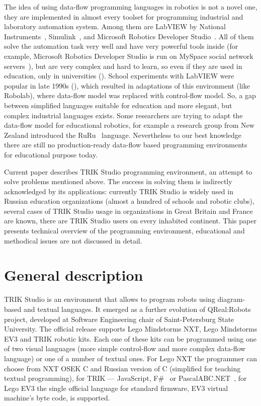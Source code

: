 \documentclass[conference]{IEEEtran}
\begin{document}
The idea of using data-flow programming languages in robotics is not a novel one, they are implemented in almost every toolset for programming industrial and laboratory automation system. Among them are LabVIEW by National Instruments~\cite{kodosky1991visual}, Simulink~\cite{dabney2004mastering}, and Microsoft Robotics Developer Studio~\cite{jackson2007microsoft}. All of them solve the automation task very well and have very powerful tools inside (for example, Microsoft Robotics Developer Studio is run on MySpace social network servers~\cite{scherotter2009ccr}), but are very complex and hard to learn, so even if they are used in education, only in universities (\cite{stefanovic2011labview,yi2005labview}). School experiments with LabVIEW were popular in late 1990s (\cite{cyr1997low,portsmore1999robolab}), which resulted in adaptations of this environment (like Robolab), where data-flow model was replaced with control-flow model. So, a gap between simplified languages suitable for education and more elegant, but complex industrial languages exists. Some researchers are trying to adapt the data-flow model for educational robotics, for example a research group from New Zealand introduced the RuRu~\cite{diprose2011ruru} language. Nevertheless to our best knowledge there are still no production-ready data-flow based programming environments for educational purpose today.

Current paper describes TRIK Studio programming environment, an attempt to solve problems mentioned above. The success in solving them is indirectly acknowledged by its applications: currently TRIK Studio is widely used in Russian education organizations (almost a hundred of schools and robotic clubs), several cases of TRIK Studio usage in organizations in Great Britain and France are known, there are TRIK Studio users on every inhabited continent. This paper presents technical overview of the programming environment, educational and methodical issues are not discussed in detail.

\section{General description}
\label{chapter:generalDescription}

TRIK Studio is an environment that allows to program robots using diagram-based and textual languages. It 	emerged as a further evolution of QReal:Robots~\cite{terekhov2013sreda} project, developed at Software Engineering chair of Saint-Petersburg State University. The official release supports Lego Mindstorms NXT, Lego Mindstorms EV3 and TRIK robotic kits. Each one of these kits can be programmed using one of two visual languages (more simple control-flow and more complex data-flow language) or one of a number of textual ones. For Lego NXT the programmer can choose from NXT OSEK C and Russian version of C (simplified for teaching textual programming), for TRIK --- JavaScript, F\#~\cite{kirsanov2014robotics} or PascalABC.NET~\cite{doliner2014basics}, for Lego EV3 the single official language for standard firmware, EV3 virtual machine's byte code, is supported.
\end{document}
